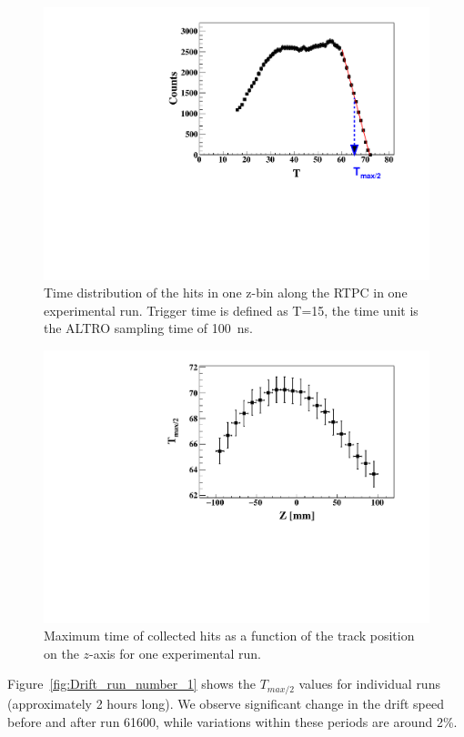 \documentclass[preprint,5p]{elsarticle}
\begin{document}
\begin{figure}[tb]
\centering
\includegraphics[scale=0.42]{hits_time_profile.pdf}
\caption[]{Time distribution of the hits in one z-bin along the RTPC in one 
experimental run. Trigger time is defined as T=15, the time unit is the ALTRO 
sampling time of 100~ns.} \label{fig:TDC_profile}
\end{figure}

\begin{figure}[tb]
\centering
\includegraphics[scale=0.42]{RunNumber_61452_TDCmax_Zslice.pdf}
\caption{Maximum time of collected hits as a function of the track
              position on the $z$-axis for one experimental run. } 
\label{fig:RunNumber_61551_TDCmax_Zslice}
\end{figure}

Figure~\ref{fig:Drift_run_number_1} shows the $T_{max/2}$ values for individual 
runs (approximately 2 hours long). We observe significant change in the drift 
speed before and after run 61600, while variations within these periods are 
around 2\%. 
\end{document}
